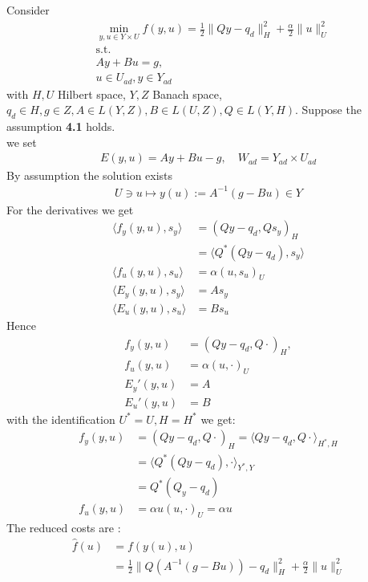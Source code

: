 \begin{example}
Consider 
\begin{align*}
	&\min_{y, u \in Y \times U} f(y, u) = \frac{1}{2} \|Qy - q_d\|_H^2  + \frac{\alpha}{2}\|u\|_U^2\\
	&\text{s.t.}\\
	& Ay + Bu = g,\\
	&u \in U_{ad}, y \in Y_{ad}
\end{align*}	
with $H,U$ Hilbert space, $Y, Z$ Banach space, $q_d \in H, g \in Z, A \in L(Y, Z), B \in L(U, Z), Q \in L(Y, H)$. Suppose the assumption \textbf{4.1} holds.\\
we set 
\begin{align*}
	E(y, u) = Ay + Bu - g, \quad W_{ad} = Y_{ad} \times U_{ad}
\end{align*}
By assumption the solution exists 
\begin{align*}
	U \ni u \mapsto y(u):= A^{-1}(g - Bu) \in Y
\end{align*}
For the derivatives we get
\begin{align*}
	\langle f_y(y, u), s_y\rangle &= (Qy - q_d, Q s_y)_H\\
	&= \langle Q^* (Qy - q_d), s_y \rangle \\
	\langle f_u(y, u), s_u \rangle &= \alpha (u, s_u)_U\\
	\langle E_y(y, u), s_y \rangle &= As_y \\
	\langle E_u(y, u), s_u \rangle &= B s_u
\end{align*}
Hence
\begin{align*}
	f_y(y, u) &= (Qy - q_d, Q \cdot)_H, \\
	f_u(y, u) &= \alpha (u, \cdot)_U\\
	E_y'(y, u) &= A\\
	E_u'(y, u) &= B 
\end{align*}
with the identification $U^* = U, H = H^*$ we get:
\begin{align*}
	f_y(y, u) &= (Qy - q_d, Q \cdot)_H = \langle Qy - q_d, Q \cdot \rangle_{H^*, H}\\
	&= \langle Q^*(Qy- q_d), \cdot \rangle_{Y^*, Y} \\
	&= Q^*(Q_y - q_d)\\
	f_u(y, u) &= \alpha u(u, \cdot)_U = \alpha u
\end{align*}
The reduced costs are :
\begin{align*}
	\hat{f}(u) &= f(y(u), u) \\
	&= \frac{1}{2} \|Q(A^{-1}(g - Bu)) - q_d\|_H^2 + \frac{\alpha}{2}\|u\|_U^2

\end{align*}
\end{example}
